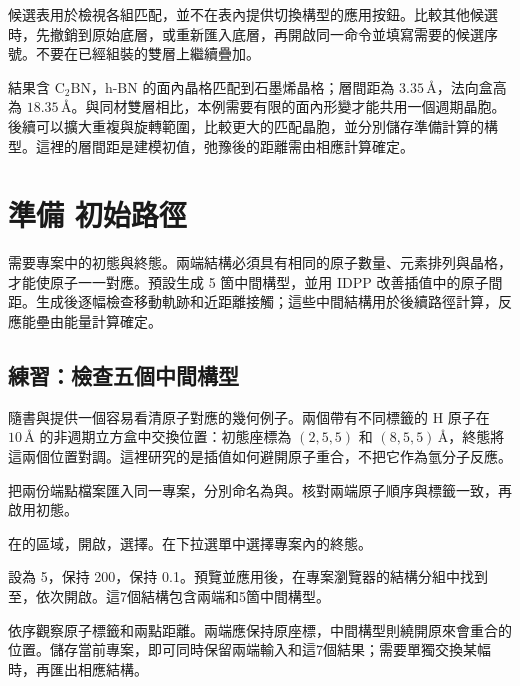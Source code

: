 候選表用於檢視各組匹配，並不在表內提供切換構型的應用按鈕。比較其他候選時，先撤銷到原始底層，或重新匯入底層，再開啟同一命令並填寫需要的候選序號。不要在已經組裝的雙層上繼續疊加。

結果含 $\mathrm{C_2BN}$，h-BN 的面內晶格匹配到石墨烯晶格；層間距為 $3.35\,\text{\AA}$，法向盒高為 $18.35\,\text{\AA}$。與同材雙層相比，本例需要有限的面內形變才能共用一個週期晶胞。後續可以擴大重複與旋轉範圍，比較更大的匹配晶胞，並分別儲存準備計算的構型。這裡的層間距是建模初值，弛豫後的距離需由相應計算確定。



\section{準備  初始路徑}

需要專案中的初態與終態。兩端結構必須具有相同的原子數量、元素排列與晶格，才能使原子一一對應。預設生成 5 箇中間構型，並用 IDPP 改善插值中的原子間距。生成後逐幅檢查移動軌跡和近距離接觸；這些中間結構用於後續路徑計算，反應能壘由能量計算確定。



\subsection{練習：檢查五個中間構型}

隨書與提供一個容易看清原子對應的幾何例子。兩個帶有不同標籤的 H 原子在 $10\,\text{\AA}$ 的非週期立方盒中交換位置：初態座標為 $(2,5,5)$ 和 $(8,5,5)\,\text{\AA}$，終態將這兩個位置對調。這裡研究的是插值如何避開原子重合，不把它作為氫分子反應。

\begin{steps}
  \item 把兩份端點檔案匯入同一專案，分別命名為與。核對兩端原子順序與標籤一致，再啟用初態。
  \item 在的區域，開啟，選擇。在下拉選單中選擇專案內的終態。
  \item {}設為 5，保持 200，保持 0.1。預覽並應用後，在專案瀏覽器的結構分組中找到至，依次開啟。這7個結構包含兩端和5箇中間構型。
  \item 依序觀察原子標籤和兩點距離。兩端應保持原座標，中間構型則繞開原來會重合的位置。儲存當前專案，即可同時保留兩端輸入和這7個結果；需要單獨交換某幅時，再匯出相應結構。
\end{steps}

